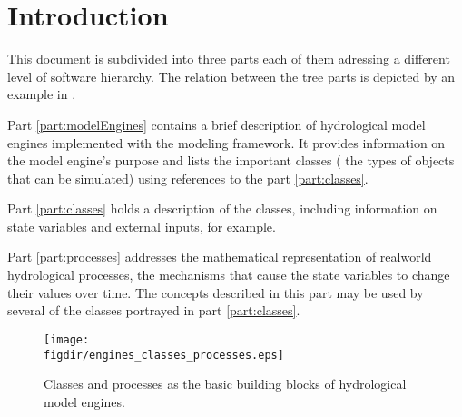 \chapter{Introduction} \label{chap:intro}
\renewcommand{\tabdir}{chapters/intro/tab}
\renewcommand{\figdir}{chapters/intro/fig}

This document is subdivided into three parts each of them adressing a different level of software hierarchy. The relation between the tree parts is depicted by an example in . 


Part \ref{part:modelEngines} contains a brief description of hydrological model engines implemented with the  modeling framework. It provides information on the model engine's purpose and lists the important classes (\ie{} the types of objects that can be simulated) using references to the part \ref{part:classes}.

Part \ref{part:classes} holds a description of the classes, including information on state variables and external inputs, for example.

Part \ref{part:processes} addresses the mathematical representation of realworld hydrological processes, \ie{} the mechanisms  that cause the state variables to change their values over time. The concepts described in this part may be used by several of the classes portrayed in part \ref{part:classes}.


\begin{figure*}[htb]
  \centering
  \texttt{[image: \\figdir/engines\_classes\_processes.eps]}
  \caption{Classes and processes as the basic building blocks of hydrological model engines. \label{fig:engines_classes_processes}}
\end{figure*}
